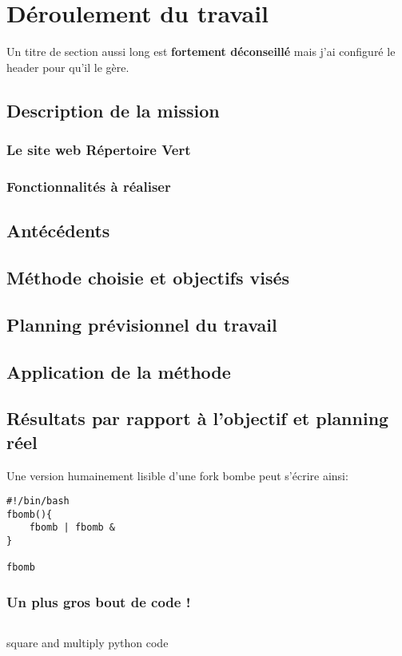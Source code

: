 \section{Déroulement du travail}

Un titre de section aussi long est \textbf{fortement déconseillé} mais j'ai configuré le header pour qu'il le gère.

\subsection{Description de la mission}
\subsubsection{Le site web Répertoire Vert}
\subsubsection{Fonctionnalités à réaliser}
\subsection{Antécédents}
\subsection{Méthode choisie et objectifs visés}
\subsection{Planning prévisionnel du travail}
\subsection{Application de la méthode}
\subsection{Résultats par rapport à l'objectif et planning réel}

Une version humainement lisible d'une fork bombe peut s'écrire ainsi:
\begin{verbatim}
#!/bin/bash
fbomb(){
    fbomb | fbomb &
}

fbomb
\end{verbatim}

\subsubsection{Un plus gros bout de code !}
\begin{listing}[H]
    \inputminted{python}{src/parts/code/example.py}
    \caption{square and multiply python code}
    \label{cd:square_and_mult}
\end{listing}

